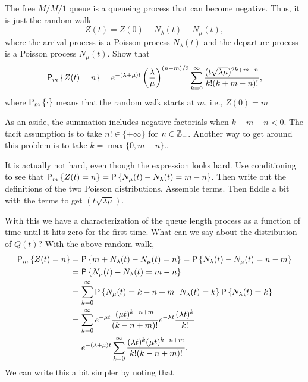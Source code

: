 \begin{exercise}  The
  free $M/M/1$ queue is a queueing process that can become
  negative. Thus, it is just the random walk
\begin{equation*}
  Z(t) = Z(0) + N_\lambda(t) - N_\mu(t), 
\end{equation*}
where the arrival process is a Poisson process $N_\lambda(t)$ and the
departure process is a Poisson process $N_\mu(t)$. Show that
\begin{equation*}
    \P{Z(t)=n}_m 
= e^{-(\lambda+\mu)t} \left(\frac\lambda\mu\right)^{(n-m)/2} \sum_{k=0}^\infty 
\frac{(t\sqrt{\lambda\mu} )^{2k+m-n}}{k!(k+m-n)!},
\end{equation*}
where $\P{\cdot}_m$ means that the random walk starts at $m$, i.e.,
$Z(0)=m$ 

As an aside, the summation includes negative factorials when
$k+m-n<0$. The tacit assumption is to take $n!\in \{\pm \infty\}$ for
$n\in \mathbb{Z}_-$. Another way to get around this problem is to take
$k=\max\{0, m-n\}$..
\begin{hint}
It is actually not hard, even though the expression looks
  hard. Use conditioning to see that
  $\P{Z(t)=n}_m = \P{N_\mu(t) - N_\lambda(t) = m - n}$. Then write out
  the definitions of the two Poisson distributions. Assemble
  terms. Then fiddle a bit with the terms to get
  $(t\sqrt{\lambda\mu})$. 
\end{hint}
\begin{solution}
With this we have a characterization of the queue length process as a
function of time until it hits zero for the first time. What can we
say about the distribution of $Q(t)$? With the above random walk, 
\begin{equation}\label{eq:29}
  \begin{split}
    \P{Z(t)=n}_m
&= \P{m+N_\lambda(t) - N_\mu(t) = n }  = \P{N_\lambda(t) - N_\mu(t) = n-m }  \\
&= \P{N_\mu(t) - N_\lambda(t) = m-n }  \\
&= \sum_{k=0}^\infty \P{N_\mu(t) = k - n + m\given N_\lambda(t) = k } \P{N_\lambda(t)=k}\\
&= \sum_{k=0}^\infty e^{-\mu t} \frac{(\mu t)^{k -n+m}}{(k-n +m)!} e^{-\lambda t} \frac{(\lambda t)^k}{k!} \\
&= e^{-(\lambda+\mu)t} \sum_{k=0}^\infty \frac{(\lambda t)^k(\mu t)^{k  -n + m }}{k!(k-n+m)!}.
  \end{split}
\end{equation}
We can write this a bit simpler by noting that
\begin{equation*}

\end{equation*}
\end{solution}
\end{exercise}
